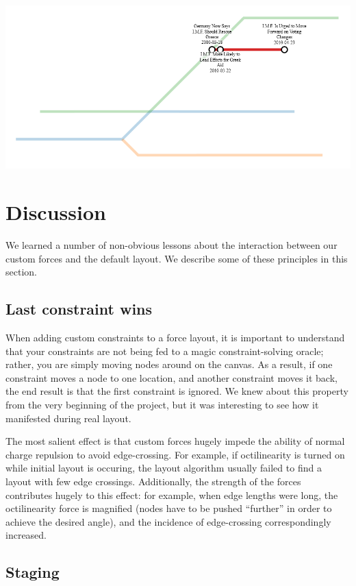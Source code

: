 \documentclass{chi2009}
\begin{document}
\includegraphics[width=\columnwidth]{Metro4.png}

\section{Discussion}

We learned a number of non-obvious lessons about the interaction between
our custom forces and the default layout.  We describe some of these
principles in this section.

\subsection{Last constraint wins}

When adding custom constraints to a force layout, it is important to
understand that your constraints are not being fed to a magic
constraint-solving oracle; rather, you are simply moving nodes around on
the canvas.  As a result, if one constraint moves a node to one
location, and another constraint moves it back, the end result is that
the first constraint is ignored.  We knew about this property from the
very beginning of the project, but it was interesting to see how it manifested
during real layout.

The most salient effect is that custom forces hugely impede the ability
of normal charge repulsion to avoid edge-crossing.  For example, if
octilinearity is turned on while initial layout is occuring, the layout
algorithm usually failed to find a layout with few edge crossings.
Additionally, the strength of the forces contributes hugely to this effect:
for example, when edge lengths were long, the octilinearity force is magnified
(nodes have to be pushed ``further'' in order to achieve the desired angle),
and the incidence of edge-crossing correspondingly increased.

\subsection{Staging}
\end{document}
